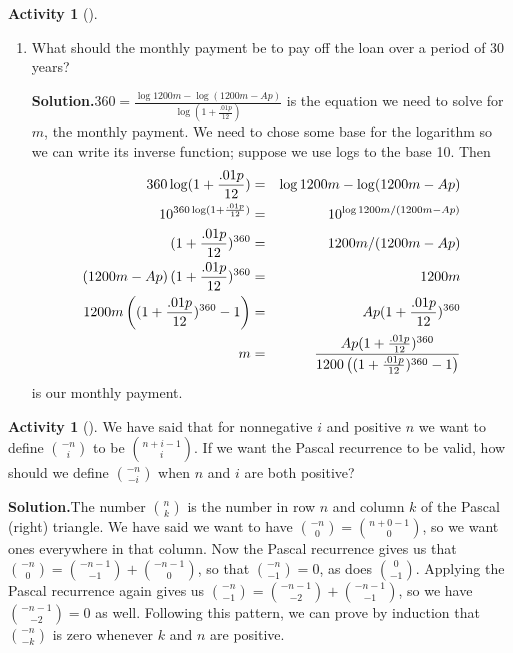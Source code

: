 \documentclass[10pt,]{book}
\theoremstyle{plain}
\theoremstyle{definition}
\newtheorem{activity}[project]{Activity}
\numberwithin{equation}{chapter}
\newcommand{\amp}{&}
\begin{document}
\begin{activity}[]
\begin{enumerate}[label=(\alph*)]
~\par
\item What should the monthly payment be to pay off the loan over a period of 30 years?%
\par\medskip\noindent%
\textbf{Solution.}\quad \(360=\frac{\log
1200m-\log (1200m-Ap)}{\log (1+\frac{.01p}{12})}\) is the equation we need to solve for \(m\), the monthly payment. We need to chose some base for the logarithm so we can write its inverse function; suppose we use logs to the base 10. Then%
\begin{align*}
360\log (1+\frac{.01p}{12}) \amp =\amp  \log
1200m-\log (1200m-Ap)\\
10^{360\log (1+\frac{.01p}{12})}\amp =\amp 10^{\log
1200m/(1200m-Ap)}\\
(1+\frac{.01p}{12})^{360} \amp =\amp 1200m/(1200m-Ap)\\
\left(1200m-Ap\right)(1+\frac{.01p}{12})^{360}\amp =\amp 1200m\\
1200m\left((1+\frac{.01p}{12})^{360}-1\right)\amp =\amp  Ap(1+\frac{.01p}{12})^{360}\\
m \amp =\amp  {Ap(1+\frac{.01p}{12})^{360}\over 1200\left((1+\frac{.01p}{12})^{360}-1\right)}
\end{align*}
is our monthly payment.%

\end{enumerate}
\end{activity}
\begin{activity}[]\label{activity-199}
We have said that for nonnegative \(i\) and positive \(n\) we want to define \(\binom{-n}{i}\) to be \(\binom{n+i-1}{i}\). If we want the Pascal recurrence to be valid, how should we define \(\binom{-n}{-i}\) when \(n\) and \(i\) are both positive?%
\par\medskip\noindent%
\textbf{Solution.}\quad The number \(\binom{n}{k}\) is the number in row \(n\) and column \(k\) of the Pascal (right) triangle. We have said we want to have \(\binom{-n}{0}=\binom{n+0-1}{0}\), so we want ones everywhere in that column. Now the Pascal recurrence gives us that \(\binom{-n}{0}=\binom{-n-1}{-1} +\binom{-n-1}{0}\), so that \(\binom{-n}{-1}=0\), as does \(\binom{0}{-1}\). Applying the Pascal recurrence again gives us \(\binom{-n}{-1}= \binom{-n-1}{-2} +\binom{-n-1}{-1}\), so we have \(\binom{-n-1}{-2}=0\) as well. Following this pattern, we can prove by induction that \(\binom{-n}{-k}\) is zero whenever \(k\) and \(n\) are positive.%
\end{activity}
\end{document}

